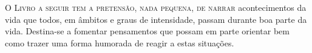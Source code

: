 \lettrine[nindent=0.35em,lhang=0.40,loversize=0.3]{O}{ Livro a seguir tem a pretensão, nada pequena, de narrar } acontecimentos da vida que todos, em âmbitos e graus de intensidade, passam durante boa parte da vida. 
Destina-se a fomentar pensamentos que possam em parte orientar bem como trazer uma forma humorada de reagir a estas situações. 
